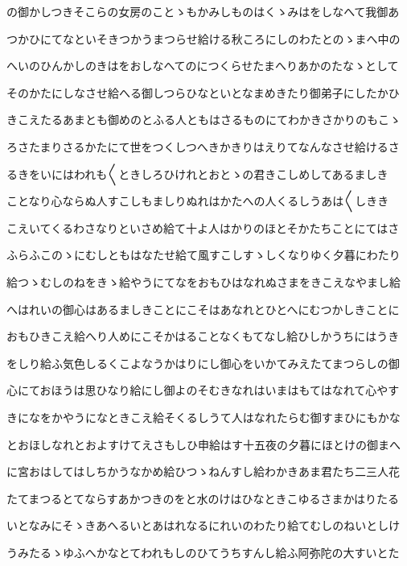 \documentclass[a4paper,11pt,landscape]{ltjtarticle}
\begin{document}
\par\medskip
の御かしつきそこらの女房のことゝもかみしものはくゝみはをしなへて我御あ
\par\medskip
つかひにてなといそきつかうまつらせ給ける秋ころにしのわたとのゝまへ中の
\par\medskip
へいのひんかしのきはをおしなへてのにつくらせたまへりあかのたなゝとして
\par\medskip
そのかたにしなさせ給へる御しつらひなといとなまめきたり御弟子にしたかひ
\par\medskip
きこえたるあまとも御めのとふる人ともはさるものにてわかきさかりのもこゝ
\par\medskip
ろさたまりさるかたにて世をつくしつへきかきりはえりてなんなさせ給けるさ
\par\medskip
るきをいにはわれも〱ときしろひけれとおとゝの君きこしめしてあるましき
\par\medskip
ことなり心ならぬ人すこしもましりぬれはかたへの人くるしうあは〱しきき
\par\medskip
こえいてくるわさなりといさめ給て十よ人はかりのほとそかたちことにてはさ
\par\medskip
ふらふこのゝにむしともはなたせ給て風すこしすゝしくなりゆく夕暮にわたり
\par\medskip
給つゝむしのねをきゝ給やうにてなをおもひはなれぬさまをきこえなやまし給
\par\medskip
へはれいの御心はあるましきことにこそはあなれとひとへにむつかしきことに
\par\medskip
おもひきこえ給へり人めにこそかはることなくもてなし給ひしかうちにはうき
\par\medskip
をしり給ふ気色しるくこよなうかはりにし御心をいかてみえたてまつらしの御
\par\medskip
心にておほうは思ひなり給にし御よのそむきなれはいまはもてはなれて心やす
\par\medskip
きになをかやうになときこえ給そくるしうて人はなれたらむ御すまひにもかな
\par\medskip
とおほしなれとおよすけてえさもしひ申給はす十五夜の夕暮にほとけの御まへ
\par\medskip
に宮おはしてはしちかうなかめ給ひつゝねんすし給わかきあま君たち二三人花
\par\medskip
たてまつるとてならすあかつきのをと水のけはひなときこゆるさまかはりたる
\par\medskip
いとなみにそゝきあへるいとあはれなるにれいのわたり給てむしのねいとしけ
\par\medskip
うみたるゝゆふへかなとてわれもしのひてうちすんし給ふ阿弥陀の大すいとた
\end{document}
